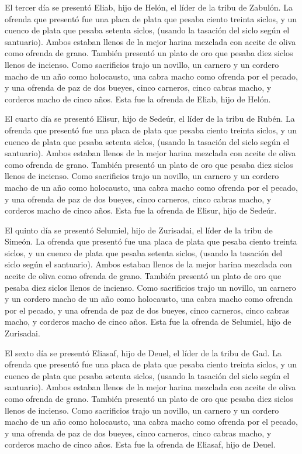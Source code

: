  El tercer día se presentó Eliab, hijo de Helón, el líder
de la tribu de Zabulón.  La ofrenda que presentó fue una
placa de plata que pesaba ciento treinta siclos, y un cuenco de plata
que pesaba setenta siclos, (usando la tasación del siclo según el
santuario). Ambos estaban llenos de la mejor harina mezclada con aceite
de oliva como ofrenda de grano.  También presentó un plato
de oro que pesaba diez siclos llenos de incienso. Como sacrificios trajo
 un novillo, un carnero y un cordero macho de un año como
holocausto,  una cabra macho como ofrenda por el pecado,
 y una ofrenda de paz de dos bueyes, cinco carneros, cinco
cabras macho, y corderos macho de cinco años. Esta fue la ofrenda de
Eliab, hijo de Helón.

 El cuarto día se presentó Elisur, hijo de Sedeúr, el líder
de la tribu de Rubén.  La ofrenda que presentó fue una
placa de plata que pesaba ciento treinta siclos, y un cuenco de plata
que pesaba setenta siclos, (usando la tasación del siclo según el
santuario). Ambos estaban llenos de la mejor harina mezclada con aceite
de oliva como ofrenda de grano.  También presentó un plato
de oro que pesaba diez siclos llenos de incienso. Como sacrificios trajo
 un novillo, un carnero y un cordero macho de un año como
holocausto,  una cabra macho como ofrenda por el pecado,
 y una ofrenda de paz de dos bueyes, cinco carneros, cinco
cabras macho, y corderos macho de cinco años. Esta fue la ofrenda de
Elisur, hijo de Sedeúr.

 El quinto día se presentó Selumiel, hijo de Zurisadai, el
líder de la tribu de Simeón.  La ofrenda que presentó fue
una placa de plata que pesaba ciento treinta siclos, y un cuenco de
plata que pesaba setenta siclos, (usando la tasación del siclo según el
santuario). Ambos estaban llenos de la mejor harina mezclada con aceite
de oliva como ofrenda de grano.  También presentó un plato
de oro que pesaba diez siclos llenos de incienso. Como sacrificios trajo
 un novillo, un carnero y un cordero macho de un año como
holocausto,  una cabra macho como ofrenda por el pecado,
 y una ofrenda de paz de dos bueyes, cinco carneros, cinco
cabras macho, y corderos macho de cinco años. Esta fue la ofrenda de
Selumiel, hijo de Zurisadai.

 El sexto día se presentó Eliasaf, hijo de Deuel, el líder
de la tribu de Gad.  La ofrenda que presentó fue una placa
de plata que pesaba ciento treinta siclos, y un cuenco de plata que
pesaba setenta siclos, (usando la tasación del siclo según el
santuario). Ambos estaban llenos de la mejor harina mezclada con aceite
de oliva como ofrenda de grano.  También presentó un plato
de oro que pesaba diez siclos llenos de incienso. Como sacrificios trajo
 un novillo, un carnero y un cordero macho de un año como
holocausto,  una cabra macho como ofrenda por el pecado,
 y una ofrenda de paz de dos bueyes, cinco carneros, cinco
cabras macho, y corderos macho de cinco años. Esta fue la ofrenda de
Eliasaf, hijo de Deuel.

